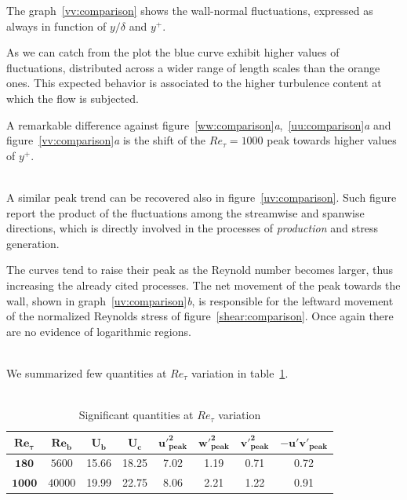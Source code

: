 The graph~\ref{vv:comparison} shows the wall-normal fluctuations, expressed as always in function of $y/\delta$ and $y^{+}$.\par
As we can catch from the plot the blue curve exhibit higher values of fluctuations, distributed across a wider range of length scales than the orange ones. This expected behavior is associated to the higher turbulence content at which the flow is subjected. \par
A remarkable difference against figure~\ref{ww:comparison}\emph{a},~\ref{uu:comparison}\emph{a} and figure~\ref{vv:comparison}\emph{a} is the shift of the $Re_{\tau}=1000$ peak towards higher values of $y^{+}$. \\~\par

A similar peak trend can be recovered also in figure~\ref{uv:comparison}. Such figure report the product of the fluctuations among the streamwise and spanwise directions, which is directly involved in the processes of \emph{production} and stress generation.\par
The curves tend to raise their peak as the Reynold number becomes larger, thus increasing the already cited processes. The net movement of the peak towards the wall, shown in graph~\ref{uv:comparison}\emph{b}, is responsible for the leftward movement of the normalized Reynolds stress of figure~\ref{shear:comparison}.
Once again there are no evidence of logarithmic regions. \\~\par

We summarized few quantities at $Re_{\tau}$ variation in table~\ref{quantities:Re}.\\~\par

\begin{table}[h]
\caption{Significant quantities at $Re_{\tau}$ variation}
\begin{center}
\begin{tabular}{cccccccc}
\toprule
$\mathbf{Re_{\tau}}$ & $\mathbf{Re_{b}}$ & $\mathbf{U_{b}}$ & $\mathbf{U_{c}}$ & $\mathbf{u'^{2}_{peak}}$ & $\mathbf{w'^{2}_{peak}}$ & $\mathbf{v'^{2}_{peak}}$ & $\mathbf{-u'v'_{peak}}$\\
\hline
$\mathbf{180}$ & $5600$ & 15.66 & 18.25 & 7.02 & 1.19 & 0.71 & 0.72 \\
$\mathbf{1000}$ & $40000$ & 19.99 & 22.75 & 8.06 & 2.21 & 1.22 & 0.91 \\
\bottomrule
\end{tabular}
\end{center}
\label{quantities:Re}
\end{table}

